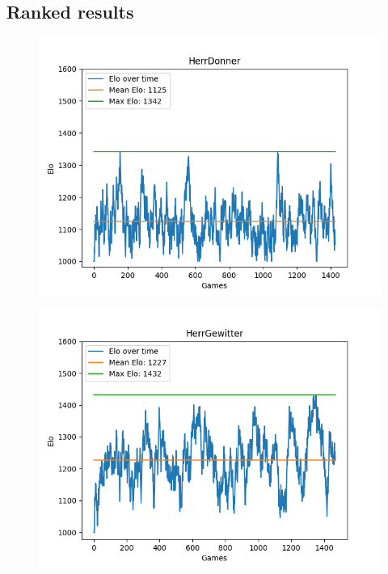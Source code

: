\subsection{Ranked results}
\begin{figure}[h]
  \centering
  \begin{minipage}{.5\textwidth}
    \centering
    \includegraphics[width=1\linewidth]{images/Donner-Elo-Time.png}
    \label{fig:donner-elo}
  \end{minipage}%
  \begin{minipage}{.5\textwidth}
    \centering
    \includegraphics[width=1\linewidth]{images/Gewitter-Elo-Time.png}
    \label{fig:gewitter-elo}
  \end{minipage}
\end{figure}
